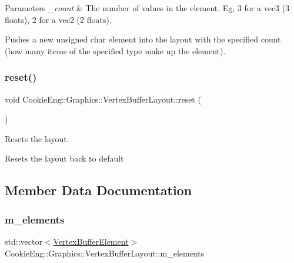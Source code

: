 \begin{DoxyParams}{Parameters}
{\em \+\_\+count} & The number of values in the element. Eg, 3 for a vec3 (3 floats), 2 for a vec2 (2 floats).\\
\hline
\end{DoxyParams}
Pushes a new unsigned char element into the layout with the specified count (how many items of the specified type make up the element). \mbox{\label{class_cookie_eng_1_1_graphics_1_1_vertex_buffer_layout_a9e511f18b0895825ff8ea2b567f89626}} 
\subsubsection{\texorpdfstring{reset()}{reset()}}
{\footnotesize\ttfamily void Cookie\+Eng\+::\+Graphics\+::\+Vertex\+Buffer\+Layout\+::reset (\begin{DoxyParamCaption}{ }\end{DoxyParamCaption})\hspace{0.3cm}{\ttfamily [inline]}}



Resets the layout. 

Resets the layout back to default 

\subsection{Member Data Documentation}
\mbox{\label{class_cookie_eng_1_1_graphics_1_1_vertex_buffer_layout_a7986bf1ce59d1ffa1dc31613014aa2e7}} 
\subsubsection{\texorpdfstring{m\+\_\+elements}{m\_elements}}
{\footnotesize\ttfamily std\+::vector$<$\hyperlink{struct_cookie_eng_1_1_graphics_1_1_vertex_buffer_element}{Vertex\+Buffer\+Element}$>$ Cookie\+Eng\+::\+Graphics\+::\+Vertex\+Buffer\+Layout\+::m\+\_\+elements\hspace{0.3cm}{\ttfamily [protected]}}

